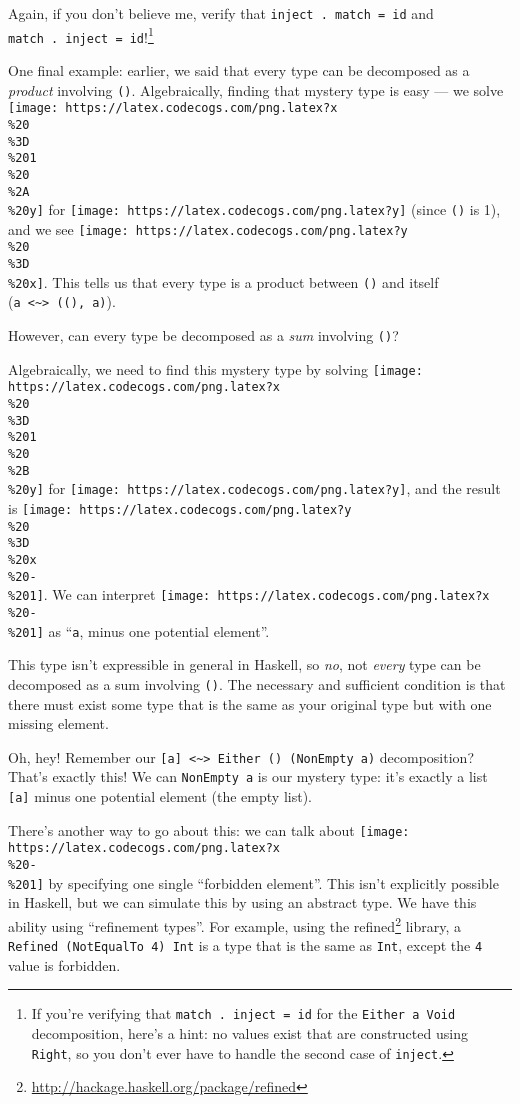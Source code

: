 \documentclass[]{article}
\renewcommand{\href}[2]{#2\footnote{\url{#1}}}
\begin{document}
Again, if you don't believe me, verify that \texttt{inject\ .\ match\ =\ id} and
\texttt{match\ .\ inject\ =\ id}!\footnote{If you're verifying that
  \texttt{match\ .\ inject\ =\ id} for the \texttt{Either\ a\ Void}
  decomposition, here's a hint: no values exist that are constructed using
  \texttt{Right}, so you don't ever have to handle the second case of
  \texttt{inject}.}

One final example: earlier, we said that every type can be decomposed as a
\emph{product} involving \texttt{()}. Algebraically, finding that mystery type
is easy --- we solve
\texttt{[image: https://latex.codecogs.com/png.latex?x\\\%20\\\%3D\\\%201\\\%20\\\%2A\\\%20y]}
for \texttt{[image: https://latex.codecogs.com/png.latex?y]} (since \texttt{()}
is 1), and we see
\texttt{[image: https://latex.codecogs.com/png.latex?y\\\%20\\\%3D\\\%20x]}. This
tells us that every type is a product between \texttt{()} and itself
(\texttt{a\ \textless{}\textasciitilde{}\textgreater{}\ ((),\ a)}).

However, can every type be decomposed as a \emph{sum} involving \texttt{()}?

Algebraically, we need to find this mystery type by solving
\texttt{[image: https://latex.codecogs.com/png.latex?x\\\%20\\\%3D\\\%201\\\%20\\\%2B\\\%20y]}
for \texttt{[image: https://latex.codecogs.com/png.latex?y]}, and the result is
\texttt{[image: https://latex.codecogs.com/png.latex?y\\\%20\\\%3D\\\%20x\\\%20-\\\%201]}.
We can interpret
\texttt{[image: https://latex.codecogs.com/png.latex?x\\\%20-\\\%201]} as
``\texttt{a}, minus one potential element''.

This type isn't expressible in general in Haskell, so \emph{no}, not
\emph{every} type can be decomposed as a sum involving \texttt{()}. The
necessary and sufficient condition is that there must exist some type that is
the same as your original type but with one missing element.

Oh, hey! Remember our
\texttt{{[}a{]}\ \textless{}\textasciitilde{}\textgreater{}\ Either\ ()\ (NonEmpty\ a)}
decomposition? That's exactly this! We can \texttt{NonEmpty\ a} is our mystery
type: it's exactly a list \texttt{{[}a{]}} minus one potential element (the
empty list).

There's another way to go about this: we can talk about
\texttt{[image: https://latex.codecogs.com/png.latex?x\\\%20-\\\%201]} by specifying
one single ``forbidden element''. This isn't explicitly possible in Haskell, but
we can simulate this by using an abstract type. We have this ability using
``refinement types''. For example, using the
\href{http://hackage.haskell.org/package/refined}{refined} library, a
\texttt{Refined\ (NotEqualTo\ 4)\ Int} is a type that is the same as
\texttt{Int}, except the \texttt{4} value is forbidden.
\end{document}
